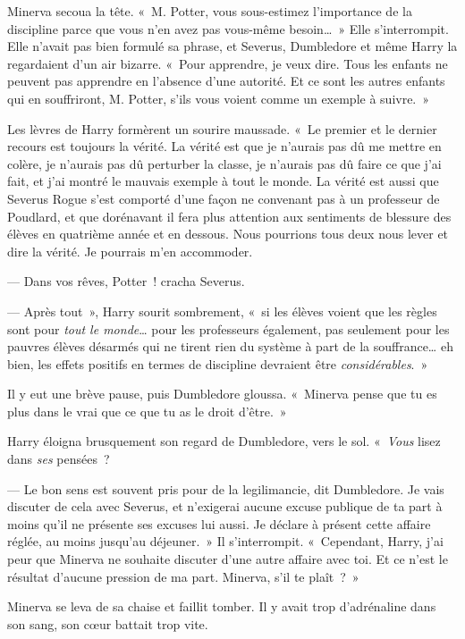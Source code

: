 Minerva secoua la tête.
«~M. Potter, vous sous-estimez l'importance de la discipline parce que vous n'en avez pas vous-même besoin…~»
Elle s'interrompit.
Elle n'avait pas bien formulé sa phrase, et Severus, Dumbledore et même Harry la regardaient d'un air bizarre.
«~Pour apprendre, je veux dire.
Tous les enfants ne peuvent pas apprendre en l'absence d'une autorité.
Et ce sont les autres enfants qui en souffriront, M. Potter, s'ils vous voient comme un exemple à suivre.~»

Les lèvres de Harry formèrent un sourire maussade.
«~Le premier et le dernier recours est toujours la vérité.
La vérité est que je n'aurais pas dû me mettre en colère, je n'aurais pas dû perturber la classe, je n'aurais pas dû faire ce que j'ai fait, et j'ai montré le mauvais exemple à tout le monde.
La vérité est aussi que Severus Rogue s'est comporté d'une façon ne convenant pas à un professeur de Poudlard, et que dorénavant il fera plus attention aux sentiments de blessure des élèves en quatrième année et en dessous.
Nous pourrions tous deux nous lever et dire la vérité.
Je pourrais m'en accommoder.

--- Dans vos rêves, Potter~! cracha Severus.

--- Après tout~», Harry sourit sombrement, «~si les élèves voient que les règles sont pour \emph{tout le monde}… pour les professeurs également, pas seulement pour les pauvres élèves désarmés qui ne tirent rien du système à part de la souffrance… eh bien, les effets positifs en termes de discipline devraient être \emph{considérables}.~»

Il y eut une brève pause, puis Dumbledore gloussa.
«~Minerva pense que tu es plus dans le vrai que ce que tu as le droit d'être.~»

Harry éloigna brusquement son regard de Dumbledore, vers le sol.
«~\emph{Vous} lisez dans \emph{ses} pensées~?

--- Le bon sens est souvent pris pour de la legilimancie, dit Dumbledore.
Je vais discuter de cela avec Severus, et n'exigerai aucune excuse publique de ta part à moins qu'il ne présente ses excuses lui aussi.
Je déclare à présent cette affaire réglée, au moins jusqu'au déjeuner.~»
Il s'interrompit.
«~Cependant, Harry, j'ai peur que Minerva ne souhaite discuter d'une autre affaire avec toi.
Et ce n'est le résultat d'aucune pression de ma part.
Minerva, s'il te plaît~?~»

Minerva se leva de sa chaise et faillit tomber.
Il y avait trop d'adrénaline dans son sang, son cœur battait trop vite.

